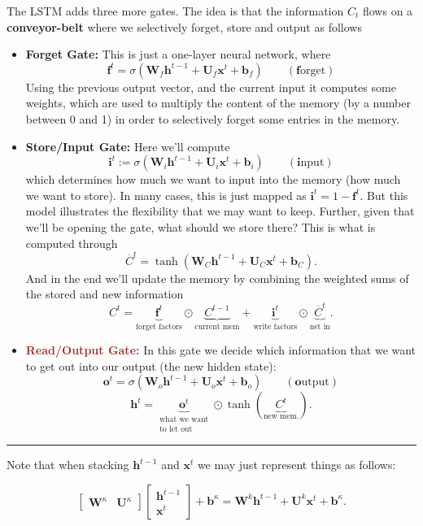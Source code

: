 \documentclass[a2paper,8pt]{extarticle}
\newcommand{\tcr}[1]{\textcolor{lighttext}{#1}}
\newcommand{\tcb}[1]{\textcolor{lighttext}{#1}}
\newcommand{\tcr}[1]{\textcolor{red}{#1}}
\newcommand{\tcb}[1]{\textcolor{blue}{#1}}
\newcommand{\mat}[1]{\mathbf{#1}}
\renewcommand{\vec}[1]{\mathbf{#1}}
\newcommand{\vb}{\vec{b}}
\newcommand{\vf}{\vec{f}}
\newcommand{\vh}{\vec{h}}
\newcommand{\vi}{\vec{i}}
\newcommand{\vo}{\vec{o}}
\newcommand{\vx}{\vec{x}}
\newcommand{\MU}{\mat{U}}
\newcommand{\MW}{\mat{W}}
\newcommand{\sep}{\vspace{0pt}\noindent\hrule\vspace{0pt}}
\newcommand{\sep}{\vspace{5pt}\noindent\hrule\vspace{5pt}}
\begin{document}
\begin{landscape}
\begin{multicols*}{7}
The LSTM adds three more gates. The idea is that the information $C_t$ flows on
a \textbf{\tcb{conveyor-belt}} where we selectively forget, store and output as
follows

\begin{itemize}
  \item \textbf{\textcolor{RubineRed}{Forget Gate:}} This is just a one-layer
  neural network, where
  \[
  \vf^t=\sigma(\MW_f\vh^{t-1}+\MU_f\vx^t+\vb_f)
  \qquad(\vf\text{orget})
  \]
  Using the previous output vector, and the current input it computes some
  weights, which are used to multiply the content of the memory (by a number
  between 0 and 1) in order to selectively forget some entries in the memory.
  \item \textbf{\tcr{Store/Input Gate:}} Here we'll compute
  \[
  \vi^t:=\sigma(\MW_i\vh^{t-1}+\MU_i\vx^t+\vb_i)
  \qquad(\vi\text{nput})
  \]
  which determines how much we want to input into the memory (how much we want
  to store). 
  In many cases, this is just mapped as $\vi^t=1-\vf^t$. But this
  model illustrates the flexibility that we may want to keep. Further, given
  that we'll be opening the gate, what should we store there? This is what is
  computed through
  \[
  \overline{C}^t=\tanh(\MW_C\vh^{t-1}+\MU_C\vx^t+\vb_C).
  \]
  And in the end we'll update the memory by combining the weighted sums of
  the stored and new information
  \[
  C^t=\underbrace{\vf^t}_{\text{forget factors}} \odot
  \underbrace{C^{t-1}}_{\text{current mem}} + \underbrace{\vi^t}_{\text{write
  factors}} \odot\underbrace{\overline{C}^t}_{\text{net in}}.
  \]
  \item \textbf{\textcolor{brown}{Read/Output Gate:}} In this gate we decide
  which information that we want to get out into our output (the new hidden
  state):
  \[
  \vo^t=\sigma(\MW_o\vh^{t-1}+\MU_o\vx^t+\vb_o)
  \qquad(\vo\text{utput})
  \]
  \[
  \vh^t=\underbrace{\vo^t}_{\substack{\text{what we want}\\\text{to let
out}}}\odot\tanh(\underbrace{C^t}_{\text{new mem.}}).
  \]
\end{itemize}

\sep

Note that when stacking $\vh^{t-1}$ and $\vx^t$ we may just represent things as
follows:

\[
\begin{bmatrix}
\MW^\kappa & \MU^\kappa
\end{bmatrix}
\begin{bmatrix}
\vh^{t-1}\\
\vx^{t}
\end{bmatrix}
+\vb^\kappa
=
\MW^k\vh^{t-1}+\MU^k\vx^t
+\vb^\kappa.
\]


\end{multicols*}
\end{landscape}
\end{document}
